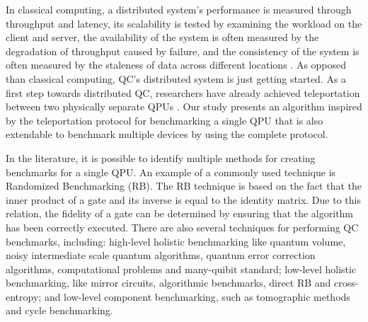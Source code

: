 
In classical computing, a distributed system's performance is measured through throughput and latency, its scalability is tested by examining the workload on the client and server, the availability of the system is often measured by the degradation of throughput caused by failure, and the consistency of the system is often measured by the staleness of data across different locations \cite{andreoliniBenchmarkingModelsTools_2002}. As opposed than classical computing, QC's distributed system is just getting started. As a first step towards distributed QC, researchers have already achieved teleportation between two physically separate QPUs \cite{kangTeleportingTwoqubitEntanglementa_2025}. Our study presents an algorithm inspired by the teleportation protocol for benchmarking a single QPU that is also extendable to benchmark multiple devices by using the complete protocol.


In the literature, it is possible to identify multiple methods for creating benchmarks for a single QPU. An example of a commonly used technique is Randomized Benchmarking (RB). The RB technique is based on the fact that the inner product of a gate and its inverse is equal to the identity matrix. Due to this relation, the fidelity of a gate can be determined by ensuring that the algorithm has been correctly executed. There are also several techniques for performing QC benchmarks, including: high-level holistic benchmarking like quantum volume, noisy intermediate scale quantum algorithms, quantum error correction algorithms, computational problems and many-quibit standard; low-level holistic benchmarking, like mirror circuits, algorithmic benchmarks, direct RB and cross-entropy; and low-level component benchmarking, such as tomographic methods and cycle benchmarking.






